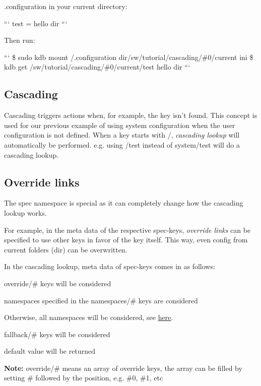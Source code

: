 {\ttfamily .configuration} in your current directory\+:

``` test = hello dir ```

Then run\+:

``` \$ sudo kdb mount /.configuration dir/sw/tutorial/cascading/\#0/current ini \$ kdb get /sw/tutorial/cascading/\#0/current/test hello dir ```

\subsection*{Cascading}

Cascading triggers actions when, for example, the key isn't found. This concept is used for our previous example of using {\ttfamily system} configuration when the {\ttfamily user} configuration is not defined. When a key starts with {\ttfamily /}, {\itshape cascading lookup} will automatically be performed. e.\+g. using {\ttfamily /test} instead of {\ttfamily system/test} will do a cascading lookup.

\subsection*{Override links}

The {\ttfamily spec} namespace is special as it can completely change how the cascading lookup works.

For example, in the meta data of the respective {\ttfamily spec}-\/keys, {\itshape override links} can be specified to use other keys in favor of the key itself. This way, even config from current folders ({\ttfamily dir}) can be overwritten.

In the cascading lookup, meta data of {\ttfamily spec}-\/keys comes in as follows\+:


\begin{DoxyEnumerate}
\item {\ttfamily override/\#} keys will be considered
\item namespaces specified in the {\ttfamily namespaces/\#} keys are considered
\item Otherwise, all namespaces will be considered, see \hyperlink{md_doc_help_elektra-namespaces_doc_help_elektra-namespaces_md}{here}.
\item {\ttfamily fallback/\#} keys will be considered
\item {\ttfamily default} value will be returned
\end{DoxyEnumerate}

{\bfseries Note\+:} {\ttfamily override/\#} means an array of {\ttfamily override} keys, the array can be filled by setting {\ttfamily \#} followed by the position, e.\+g. {\ttfamily \#0}, {\ttfamily \#1}, etc

